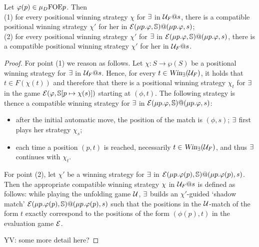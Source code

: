\begin{proposition}\label{p:unfold=evalgame2}
Let %
$\varphi(p) \in \mu_{D}\mathrm{FOE}{p}$. Then 
\\(1) for every positional winning strategy $\chi$ for $\exists$ in $\mathcal{U}_F@s$,
there is a compatible positional winning strategy $\chi'$ for her in 
$\mathcal{E}(\mu p.\varphi,\mathbb{S})@(\mu p.\varphi,s)$;
\\(2) for every positional winning strategy $\chi'$ for $\exists$ in 
$\mathcal{E}(\mu p.\varphi,\mathbb{S})@(\mu p.\varphi,s)$, there is a compatible  positional 
winning strategy $\chi'$ for her in $\mathcal{U}_F@s$.
\end{proposition}

\begin{proof}
For point (1) we reason as follows. 
Let $\chi: S \to \wp{(S)}$  be a positional winning strategy for $\exists$ in $\mathcal{U}_F@s$. 
Hence, for every $t \in \win_{\eloise}(\UG_{F})$, it holds that $t \in F(\chi(t))$ 
and therefore that there is a positional winning strategy $\chi_t$ for $\exists$ 
in the game $\mathcal{E}(\varphi,\mathbb{S}[p \mapsto \chi(s)])$ starting at $(\phi,t)$. 
The following  strategy is thence a compatible winning strategy for $\exists$ in
$\mathcal{E}(\mu p.\varphi,\mathbb{S})@(\mu p.\varphi,s)$:
\begin{itemize}
\item after the initial automatic move, the position of the match is $(\phi,s)$; 
$\exists$ first plays her strategy $\chi_s$;
\item each time a position $(p,t)$ is reached, necessarily 
$t \in \win_{\eloise}(\UG_{F})$, and thus $\exists$ continues with $\chi_t$.
\end{itemize}
For point (2), let $\chi'$ be a winning strategy for $\exists$ in
$\mathcal{E}(\mu p.\varphi(p),\mathbb{S})@(\mu p.\varphi(p),s)$. 
Then the appropriate compatible winning strategy $\chi$ in $\mathcal{U}_{F}@s$ is 
defined as follows: while playing the unfolding game $\mathcal{U}$, $\exists$ builds an 
$\chi'$-guided `shadow match' $\mathcal{E}(\mu p.\varphi(p),\mathbb{S})@(\mu p.\varphi(p),s)$ 
such that the positions in the $\mathcal{U}$-match of the form $t$ exactly correspond to
the positions of the form $(\phi(p),t)$ in the evaluation game $\mathcal{E}$.
\btbs
\item YV: some more detail here?
\etbs
\end{proof}

